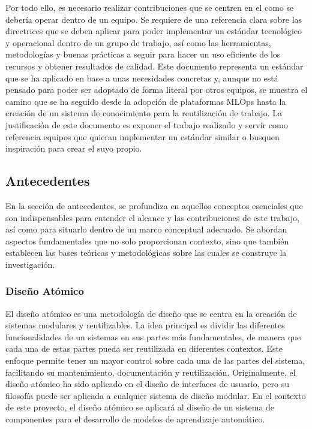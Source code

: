 Por todo ello, es necesario realizar contribuciones que se centren en el como 
se debería operar dentro de un equipo. Se requiere de una referencia clara sobre las 
directrices que se deben aplicar para poder implementar un estándar tecnológico y
operacional dentro de un grupo de trabajo, así como las herramientas, metodologías y buenas prácticas
a seguir para hacer un uso eficiente de los recursos y obtener resultados de calidad.
Este documento representa un estándar que se ha aplicado en base a unas necesidades
concretas y, aunque no está pensado para poder ser adoptado de forma literal por otros equipos,
se muestra el camino que se ha seguido desde la adopción de plataformas MLOps hasta la creación
de un sistema de conocimiento para la reutilización de trabajo. La justificación de este
documento es exponer el trabajo realizado y servir como referencia equipos que quieran implementar
un estándar similar o busquen inspiración para crear el suyo propio.
 

\subsection{Antecedentes}
En la sección de antecedentes, se profundiza en aquellos conceptos esenciales que son 
indispensables para entender el alcance y las contribuciones de este trabajo, así como 
para situarlo dentro de un marco conceptual adecuado. Se abordan aspectos fundamentales 
que no solo proporcionan contexto, sino que también establecen las bases teóricas y 
metodológicas sobre las cuales se construye la investigación.

\subsubsection{Diseño Atómico}
El diseño atómico es una metodología de diseño que se centra en la creación
de sistemas modulares y reutilizables. La idea principal es dividir
las diferentes funcionalidades de un sistemas en sus partes más fundamentales,
de manera que cada una de estas partes pueda ser reutilizada en diferentes
contextos. Este enfoque permite tener un mayor control sobre cada una de las
partes del sistema, facilitando su mantenimiento, documentación y reutilización.
Originalmente, el diseño atómico ha sido aplicado en el diseño de interfaces
de usuario, pero su filosofía puede ser aplicada a cualquier sistema de diseño
modular. En el contexto de este proyecto, el diseño atómico se aplicará al
diseño de un sistema de componentes para el desarrollo de modelos de aprendizaje
automático.\medskip

